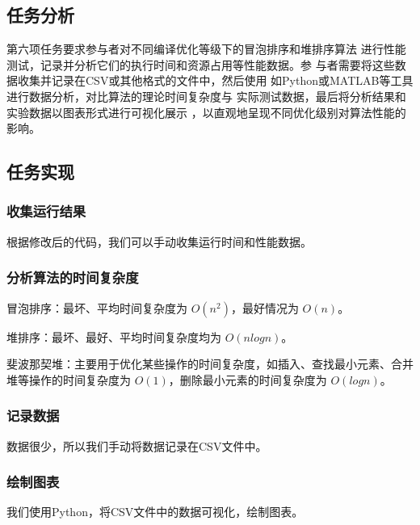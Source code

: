 \documentclass[UTF8]{ctexart}
\begin{document}
\subsection{任务分析}
第六项任务要求参与者对不同编译优化等级下的冒泡排序和堆排序算法
进行性能测试，记录并分析它们的执行时间和资源占用等性能数据。参
与者需要将这些数据收集并记录在CSV或其他格式的文件中，然后使用
如Python或MATLAB等工具进行数据分析，对比算法的理论时间复杂度与
实际测试数据，最后将分析结果和实验数据以图表形式进行可视化展示
，以直观地呈现不同优化级别对算法性能的影响。

\subsection{任务实现}
\subsubsection{收集运行结果}
根据修改后的代码，我们可以手动收集运行时间和性能数据。
\subsubsection{分析算法的时间复杂度}
冒泡排序：最坏、平均时间复杂度为 $O(n^2)$，最好情况为 $O(n)$。

堆排序：最坏、最好、平均时间复杂度均为 $O(n log n)$。

斐波那契堆：主要用于优化某些操作的时间复杂度，如插入、查找最小元素、合并堆等操作的时间复杂度为 $O(1)$，删除最小元素的时间复杂度为 $O(log n)$。


\subsubsection{记录数据}
数据很少，所以我们手动将数据记录在CSV文件中。

\subsubsection{绘制图表}
我们使用Python，将CSV文件中的数据可视化，绘制图表。
\end{document}
